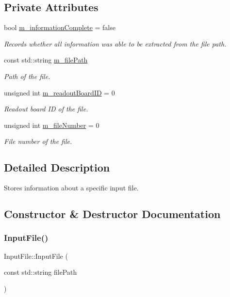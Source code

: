 \subsection*{Private Attributes}
\begin{DoxyCompactItemize}
\item 
bool \hyperlink{class_input_file_ab4724adf6c3da88760dccc42d6b6401d}{m\+\_\+information\+Complete} = false
\begin{DoxyCompactList}\small\item\em Records whether all information was able to be extracted from the file path. \end{DoxyCompactList}\item 
const std\+::string \hyperlink{class_input_file_ae3a763e9997cebb9f50aef29499d53c2}{m\+\_\+file\+Path}
\begin{DoxyCompactList}\small\item\em Path of the file. \end{DoxyCompactList}\item 
unsigned int \hyperlink{class_input_file_a15431dd487c5ac563745856544c9261d}{m\+\_\+readout\+Board\+ID} = 0
\begin{DoxyCompactList}\small\item\em Readout board ID of the file. \end{DoxyCompactList}\item 
unsigned int \hyperlink{class_input_file_af5c90eb7ded9297cc12248935968ee87}{m\+\_\+file\+Number} = 0
\begin{DoxyCompactList}\small\item\em File number of the file. \end{DoxyCompactList}\end{DoxyCompactItemize}


\subsection{Detailed Description}
Stores information about a specific input file. 

\subsection{Constructor \& Destructor Documentation}
\mbox{\label{class_input_file_a36704203477e78e7de3ff4b98276e3a6}} 
\subsubsection{\texorpdfstring{Input\+File()}{InputFile()}}
{\footnotesize\ttfamily Input\+File\+::\+Input\+File (\begin{DoxyParamCaption}\item[{const std\+::string}]{file\+Path }\end{DoxyParamCaption})}



